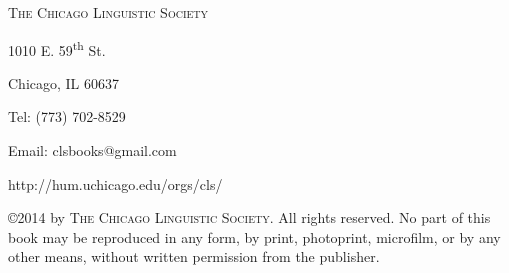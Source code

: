 \documentclass[12pt]{article}
\begin{document}
\vspace{1em}

\textsc{The Chicago Linguistic Society}

1010 E. 59\textsuperscript{th} St.

Chicago, IL 60637

Tel: (773) 702-8529

Email: clsbooks@gmail.com

http://hum.uchicago.edu/orgs/cls/ 

\vspace{1em}

\copyright 2014 by \textsc{The Chicago Linguistic Society}. All rights reserved. No part of this book may be reproduced in any form, by print, photoprint, microfilm, or by any other means, without written permission from the publisher.
\end{document}
